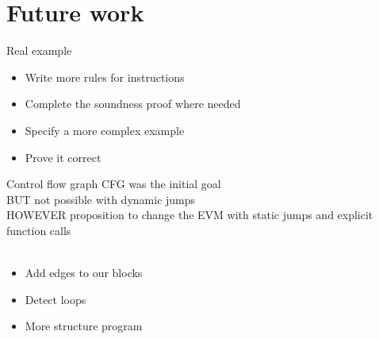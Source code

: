 \documentclass{beamer}
\begin{document}
\part{Future work}
\frame[plain]{\partpage}

\begin{frame}{Real example}
	\begin{itemize}
		\item Write more rules for instructions
		\item Complete the soundness proof where needed
		\item Specify a more complex example
		\item Prove it correct
	\end{itemize}
\end{frame}

\begin{frame}{Control flow graph}
	CFG was the initial goal\\
	BUT not possible with dynamic jumps\\
	HOWEVER proposition to change the EVM with static jumps and explicit function calls
	\\~\\
	\begin{itemize}
		\item Add edges to our blocks
		\item Detect loops
		\item More structure program
	\end{itemize}
\end{frame}



\end{document}
